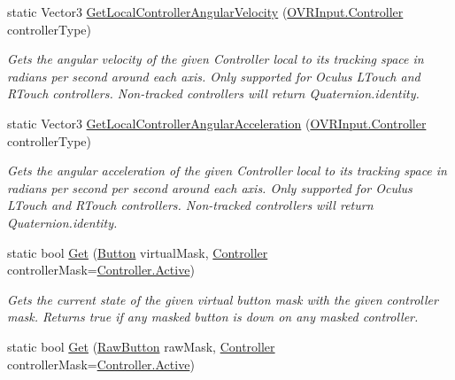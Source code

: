 \begin{DoxyCompactItemize}
static Vector3 \mbox{\hyperlink{class_o_v_r_input_a98fc49ac302d343de505be72f6aec495}{Get\+Local\+Controller\+Angular\+Velocity}} (\mbox{\hyperlink{class_o_v_r_input_a5c86f9052a9cbb0b73779ff5704d60a8}{O\+V\+R\+Input.\+Controller}} controller\+Type)
\begin{DoxyCompactList}\small\item\em Gets the angular velocity of the given Controller local to its tracking space in radians per second around each axis. Only supported for Oculus L\+Touch and R\+Touch controllers. Non-\/tracked controllers will return Quaternion.\+identity. \end{DoxyCompactList}\item 
static Vector3 \mbox{\hyperlink{class_o_v_r_input_a065d9defd470387ea588a374d2c1c6b3}{Get\+Local\+Controller\+Angular\+Acceleration}} (\mbox{\hyperlink{class_o_v_r_input_a5c86f9052a9cbb0b73779ff5704d60a8}{O\+V\+R\+Input.\+Controller}} controller\+Type)
\begin{DoxyCompactList}\small\item\em Gets the angular acceleration of the given Controller local to its tracking space in radians per second per second around each axis. Only supported for Oculus L\+Touch and R\+Touch controllers. Non-\/tracked controllers will return Quaternion.\+identity. \end{DoxyCompactList}\item 
static bool \mbox{\hyperlink{class_o_v_r_input_a8ed5f1b79ace01d32a26c222aa64c50c}{Get}} (\mbox{\hyperlink{class_o_v_r_input_aed3cf5b4b5e0669cea0941f61e018ee5}{Button}} virtual\+Mask, \mbox{\hyperlink{class_o_v_r_input_a5c86f9052a9cbb0b73779ff5704d60a8}{Controller}} controller\+Mask=\mbox{\hyperlink{class_o_v_r_input_a5c86f9052a9cbb0b73779ff5704d60a8a4d3d769b812b6faa6b76e1a8abaece2d}{Controller.\+Active}})
\begin{DoxyCompactList}\small\item\em Gets the current state of the given virtual button mask with the given controller mask. Returns true if any masked button is down on any masked controller. \end{DoxyCompactList}\item 
static bool \mbox{\hyperlink{class_o_v_r_input_abf55006f2fbc436561df178f7cb5a45a}{Get}} (\mbox{\hyperlink{class_o_v_r_input_a9d6423af820e22b93f0b33a4fc4bf77a}{Raw\+Button}} raw\+Mask, \mbox{\hyperlink{class_o_v_r_input_a5c86f9052a9cbb0b73779ff5704d60a8}{Controller}} controller\+Mask=\mbox{\hyperlink{class_o_v_r_input_a5c86f9052a9cbb0b73779ff5704d60a8a4d3d769b812b6faa6b76e1a8abaece2d}{Controller.\+Active}})

\end{DoxyCompactItemize}
